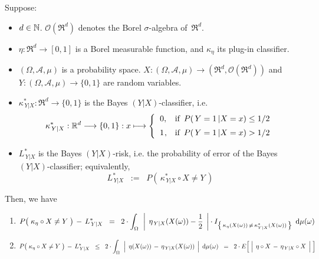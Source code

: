 
\vskip 0.5cm
\begin{theorem}
\mbox{}\vskip 0.1cm
\noindent
Suppose:
\begin{itemize}
\item
	$d \in \mathbb{N}$.
	$\mathcal{O}(\Re^{d})$ denotes the Borel $\sigma$-algebra of \,$\Re^{d}$.
\item
	$\eta : \Re^{d} \longrightarrow [0,1]$ is a Borel measurable function, and
	$\kappa_{\eta}$ its plug-in classifier.
\item
	$(\Omega,\mathcal{A},\mu)$ is a probability space.
	$X : (\Omega,\mathcal{A},\mu) \longrightarrow (\Re^{d},\mathcal{O}(\Re^{d}))$ and\,
	$Y : (\Omega,\mathcal{A},\mu) \longrightarrow \{0,1\}$
	are random variables.
\item
	$\kappa^{*}_{\,Y \vert X} : \Re^{d} \longrightarrow \{0,1\}$ is the Bayes $(Y \vert X)$-classifier, i.e.
	\begin{equation*}
	\kappa^{*}_{\,Y \vert X} : \Re^{d} \longrightarrow \{0,1\} : x \longmapsto
		\left\{\begin{array}{cl}
			0, & \textnormal{if \,$P(\,Y=1 \,\vert X = x) \leq 1/2$}
			\\
			\overset{{\color{white}-}}{1}, & \textnormal{if \,$P(\,Y=1 \,\vert X = x) > 1/2$}
		\end{array}\right.
	\end{equation*}
\item
	$L^{*}_{\,Y \vert X}$ is the Bayes $(Y \vert X)$-risk,
	i.e. the probability of error of the Bayes $(Y \vert X)$-classifier;
	equivalently,
	\begin{equation*}
	L^{*}_{\,Y \vert X} \;\; := \;\; P\!\left(\, \kappa^{*}_{\,Y \vert X} \circ X \neq Y \,\right)
	\end{equation*}	
\end{itemize}
Then, we have
\begin{enumerate}
\item
	\begin{equation*}
	P\!\left(\;\kappa_{\eta} \overset{{\color{white}.}}{\circ} X \neq Y \;\right) \,-\, L^{*}_{\,Y \vert X}
	\;\; = \;\;
		2 \cdot \int_{\Omega}\,\;
			\left\vert\;\, \eta_{\,Y\vert X}(X(\omega)) - \dfrac{1}{2} \;\,\right\vert
			\cdot
			I_{\left\{\,\kappa_{\eta}(X(\omega)) \,\neq\, \kappa^{*}_{Y \vert X}(X(\omega))\,\right\}}
			\,\;\d\mu(\omega)
	\end{equation*}
\item
	\begin{equation*}
	P\!\left(\;\kappa_{\eta} \overset{{\color{white}.}}{\circ} X \neq Y \;\right) \,-\, L^{*}_{\,Y \vert X}
	\;\; \leq \;\;
		2 \cdot \int_{\Omega}\,\;
			\left\vert\;\, \eta(X(\omega)) \,\overset{{\color{white}.}}{-}\, \eta_{\,Y\vert X}(X(\omega)) \;\,\right\vert
			\;\d\mu(\omega)
	\;\; = \;\;
		2 \cdot E\!\left[\;
			\left\vert\;\, \eta \circ X \,\overset{{\color{white}.}}{-}\, \eta_{\,Y\vert X} \circ X \;\,\right\vert
			\;\right]
	\end{equation*}
\end{enumerate}
\end{theorem}
